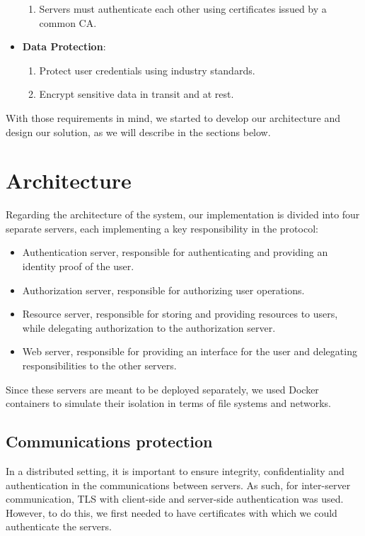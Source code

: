 \documentclass[10pt]{article}
\begin{document}
\begin{itemize}
\begin{enumerate}
            \item Servers must authenticate each other using certificates issued by a common CA.
        \end{enumerate}
    \item \textbf{Data Protection}:
        \begin{enumerate}
            \item Protect user credentials using industry standards.
            \item Encrypt sensitive data in transit and at rest.
        \end{enumerate}
\end{itemize}

With those requirements in mind, we started to develop our architecture and design our solution, as we will describe in the sections below.

\section{Architecture}

Regarding the architecture of the system, our implementation is divided into four separate servers, each implementing a key responsibility in the protocol:

\begin{itemize}
\item Authentication server, responsible for authenticating and providing an identity proof of the user.
\item Authorization server, responsible for authorizing user operations.
\item Resource server, responsible for storing and providing resources to users, while delegating authorization to the authorization server.
\item Web server, responsible for providing an interface for the user and delegating responsibilities to the other servers.
\end{itemize}

Since these servers are meant to be deployed separately, we used Docker containers to simulate their isolation in terms of file systems and networks.

\subsection{Communications protection}

In a distributed setting, it is important to ensure integrity, confidentiality and authentication in the communications between servers. As such, for inter-server communication, TLS with client-side and server-side authentication was used. However, to do this, we first needed to have certificates with which we could authenticate the servers. 
\end{document}
